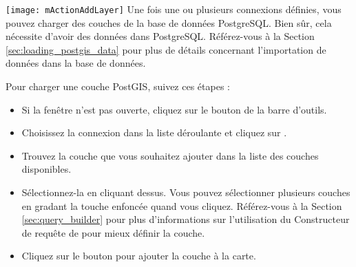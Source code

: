 \texttt{[image: mActionAddLayer]} Une fois une ou plusieurs connexions définies, vous pouvez charger des couches de la base de données PostgreSQL. Bien sûr, cela nécessite d'avoir des données dans PostgreSQL. Référez-vous à la Section \ref{sec:loading_postgis_data} pour plus de détails concernant l'importation de données dans la base de données.

Pour charger une couche PostGIS, suivez ces étapes :

\begin{itemize}[label=--]
\item Si la fenêtre  n'est pas ouverte, cliquez sur le bouton  de la barre d'outils.
\item Choisissez la connexion dans la liste déroulante et cliquez sur .
\item Trouvez la couche que vous souhaitez ajouter dans la liste des couches disponibles.
\item Sélectionnez-la en cliquant dessus. Vous pouvez sélectionner plusieurs couches en gradant la touche  enfoncée quand vous cliquez. Référez-vous à la Section \ref{sec:query_builder} pour plus d'informations sur l'utilisation du Constructeur de requête de \psq pour mieux définir la couche.
\item Cliquez sur le bouton  pour ajouter la couche à la carte.
\end{itemize}

